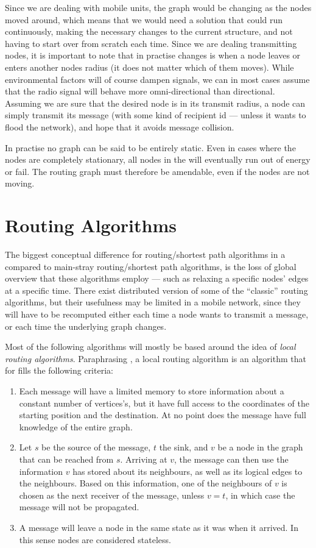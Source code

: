 \documentclass[letter, 12pt, english, draft]{article}
\begin{document}
Since we are dealing with mobile units, the graph would be changing as the nodes moved around, which means that we would need a solution that could run continuously, making the necessary changes to the current structure, and not having to start over from scratch each time. Since we are dealing transmitting nodes, it is important to note that in practise changes is when a node leaves or enters another nodes radius (it does not matter which of them moves). While environmental factors will of course dampen signals, we can in most cases assume that the radio signal will behave more omni-directional than directional. Assuming we are sure that the desired node is in its transmit radius, a node can simply transmit its message (with some kind of recipient id --- unless it wants to flood the network), and hope that it avoids message collision.   

In practise no graph can be said to be entirely static. Even in cases where the nodes are completely stationary, all nodes in the \anet will eventually run out of energy or fail. The routing graph must therefore be amendable, even if the nodes are not moving. 

\section{Routing Algorithms}

The biggest conceptual difference for routing/shortest path algorithms in a \manet compared to main-stray routing/shortest path algorithms, is the loss of global overview that these algorithms employ --- such as relaxing a specific nodes' edges at a specific time. There exist distributed version of some of the ``classic'' routing algorithms, but their usefulness may be limited in a mobile network, since they will have to be recomputed either each time a node wants to transmit a message, or each time the underlying graph changes.

Most of the following algorithms will mostly be based around the idea of \emph{local routing algorithms}. Paraphrasing \cite{compass}, a local routing algorithm is an algorithm that for fills the following criteria:
\begin{enumerate}
\item Each message will have a limited memory to store information about a constant number of vertices's, but it have full access to the coordinates of the starting position and the destination. At no point does the message have full knowledge of the entire graph.
\item Let $s$ be the source of the message, $t$ the sink, and $v$ be a node in the graph that can be reached from $s$. Arriving at $v$, the message can then use the information $v$ has stored about its neighbours, as well as its logical edges to the neighbours. Based on this information, one of the neighbours of $v$ is chosen as the next receiver of the message, unless $v = t$, in which case the message will not be propagated.
\item A message will leave a node in the same state as it was when it arrived. In this sense nodes are considered stateless.\end{enumerate}
\end{document}
